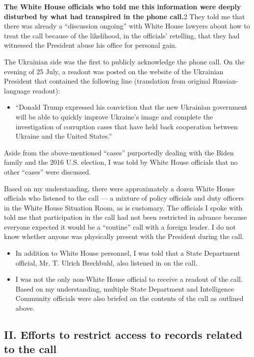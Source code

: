 \textbf{The White House officials who told me this information were
deeply disturbed by what had transpired in the phone call.}2 They told
me that there was already a ``discussion ongoing'' with White House
lawyers about how to treat the call because of the likelihood, in the
officials' retelling, that they had witnessed the President abuse his
office for personal gain.

The Ukrainian side was the first to publicly acknowledge the phone call.
On the evening of 25 July, a readout was posted on the website of the
Ukrainian President that contained the following line (translation from
original Russian-language readout):

\begin{itemize}
\tightlist
\item
  ``Donald Trump expressed his conviction that the new Ukrainian
  government will be able to quickly improve Ukraine's image and
  complete the investigation of corruption cases that have held back
  cooperation between Ukraine and the United States.''
\end{itemize}

Aside from the above-mentioned ``cases'' purportedly dealing with the
Biden family and the 2016 U.S. election, I was told by White House
officials that no other ``cases'' were discussed.

Based on my understanding, there were approximately a dozen White House
officials who listened to the call --- a mixture of policy officials and
duty officers in the White House Situation Room, as is customary. The
officials I spoke with told me that participation in the call had not
been restricted in advance because everyone expected it would be a
``routine'' call with a foreign leader. I do not know whether anyone was
physically present with the President during the call.

\begin{itemize}
\tightlist
\item
  In addition to White House personnel, I was told that a State
  Department official, Mr. T. Ulrich Brechbuhl, also listened in on the
  call.
\item
  I was not the only non-White House official to receive a readout of
  the call. Based on my understanding, multiple State Department and
  Intelligence Community officials were also briefed on the contents of
  the call as outlined above.
\end{itemize}

\hypertarget{ii-efforts-to-restrict-access-to-records-related-to-the-call}{%
\subsection{II. Efforts to restrict access to records related to the
call}\label{ii-efforts-to-restrict-access-to-records-related-to-the-call}}

